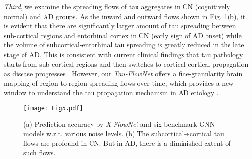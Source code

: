 \documentclass{article}
\begin{document}

\textit{Third}, we examine the spreading flows of tau aggregates in CN (cognitively normal) and AD groups. As the inward and outward flows shown in Fig. \ref{experiments2}(b), it is evident that there are significantly larger amount of tau spreading between sub-cortical regions and entorhinal cortex in CN (early sign of AD onset) while the volume of subcortical-entorhinal tau spreading is greatly reduced in the late stage of AD. This is consistent with current clinical findings that tau pathology starts from sub-cortical regions and then switches to cortical-cortical propagation as disease progresses \cite{lee2022regional}. However, our \textit{Tau-FlowNet} offers a fine-granularity brain mapping of region-to-region spreading flows over time, which provides a new window to understand the tau propagation mechanism in AD etiology \cite{dujardin2022tau}.


\begin{figure}[h!]
  \centering
    {\texttt{[image: Fig5.pdf]}}
  \caption{\small (a) Prediction accuracy by \textit{X-FlowNet} and six benchmark GNN models w.r.t. various noise levels. (b) The subcortical$\shortrightarrow$cortical tau flows are profound in CN. But in AD, there is a diminished extent of such flows.}
  \label{experiments2}
\end{figure}
\end{document}
